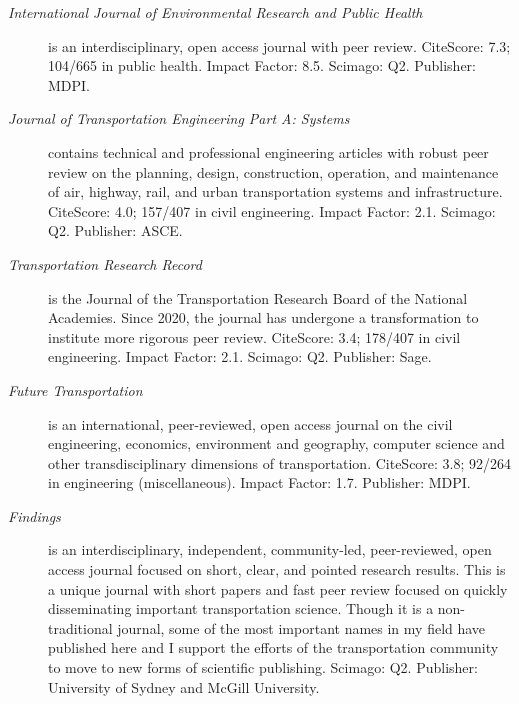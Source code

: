 \documentclass[margin,line]{res}
\begin{document}
\begin{resume}
\begin{description}
  \item[\textit{International Journal of Environmental Research and Public Health}]
  is an interdisciplinary, open access journal with peer review. CiteScore: 7.3;
  104/665 in public health. Impact Factor: 8.5. Scimago: Q2. Publisher: MDPI.
  \item[\textit{Journal of Transportation Engineering Part A: Systems}] contains
  technical and professional engineering articles with robust peer review on the
  planning, design, construction, operation, and maintenance of air, highway,
  rail, and urban transportation systems and infrastructure.  CiteScore: 4.0;
  157/407 in civil engineering. Impact Factor: 2.1. Scimago: Q2. Publisher: ASCE.
  \item[\textit{Transportation Research Record}] is the Journal of the
  Transportation Research Board of the National Academies. Since 2020, the 
  journal has undergone a transformation to institute more rigorous peer review.
  CiteScore: 3.4; 178/407 in civil engineering. Impact Factor: 2.1. Scimago: Q2. Publisher: Sage.
  \item[\textit{Future Transportation}] is an international, peer-reviewed, open
  access journal on the civil engineering, economics, environment and geography,
  computer science and other transdisciplinary dimensions of transportation. 
  CiteScore: 3.8; 92/264 in engineering (miscellaneous). Impact Factor: 1.7. Publisher: MDPI.
  \item[\textit{Findings}] is an interdisciplinary, independent, community-led,
  peer-reviewed, open access journal focused on short, clear, and pointed
  research results. This is a unique journal with short papers and fast peer review
  focused on quickly disseminating important transportation science. Though it is a
  non-traditional journal, some of the most important names in my field have 
  published here and I support the efforts of the transportation community to
  move to new forms of scientific publishing.
  Scimago: Q2. Publisher: University of Sydney and McGill University.
\end{description}
\fi



\end{resume}
\end{document}
